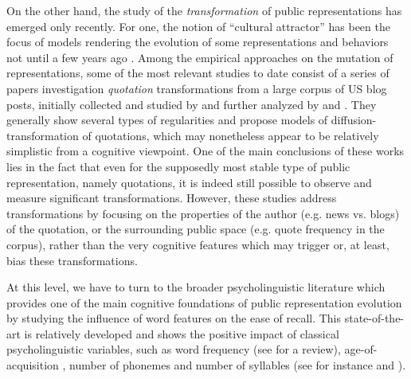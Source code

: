 On the other hand, the study of the \emph{transformation} of public representations has emerged only recently. For one, the notion of ``cultural attractor'' has been the focus of models rendering the evolution of some representations and behaviors not until a few years ago \citep{Claidiere07}. Among the empirical approaches on the mutation of representations, some of the most relevant studies to date consist of a series of papers investigation \emph{quotation} transformations from a large corpus of US blog posts, initially collected and studied by \citet{Leskovec09} and further analyzed by \citet{Simmons11} and \citet{omod-mult}. They generally show several types of regularities and propose models of diffusion-transformation of quotations, which may nonetheless appear to be relatively simplistic from a cognitive viewpoint.  One of the main conclusions of these works lies in the fact that even for the supposedly most stable type of public representation, namely quotations, it is indeed still possible to observe and measure significant transformations.  However, these studies address transformations by focusing on the properties of the author (e.g. news vs. blogs) of the quotation, or the surrounding public space (e.g. quote frequency in the corpus), rather than the very cognitive features which may trigger or, at least, bias these transformations. %

At this level, we have to turn to the broader psycholinguistic literature which provides one of the main cognitive foundations of public representation evolution by studying the influence of word features on the ease of recall. This state-of-the-art is relatively developed and shows the positive impact of classical psycholinguistic variables, such as word frequency (see \citet{Yonelinas02} for a review), age-of-acquisition \citep{Zevin02}, number of phonemes and number of syllables (see for instance \citet{Rey98} and \citet{nick-diss}).

